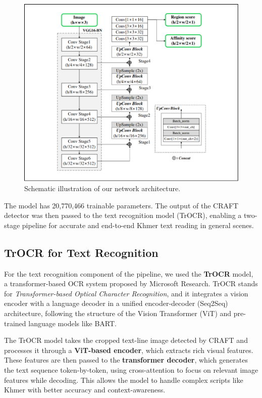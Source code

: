 \begin{figure}[H]
    \centering
    \includegraphics[width=\textwidth]{figures/craft_model.png}
    \caption{Schematic illustration of our network architecture.
    \citep{baek2019craft}}
    \label{fig:craft-model}
\end{figure}

The model has 20,770,466 trainable parameters. The output of the CRAFT detector was then passed to the text recognition 
model (TrOCR), enabling a two-stage pipeline for accurate and end-to-end 
Khmer text reading in general scenes.

\subsection{TrOCR for Text Recognition}
\label{subsec:trocr}

For the text recognition component of the pipeline, we used the \textbf{TrOCR} model, 
a transformer-based OCR system proposed by Microsoft Research. TrOCR stands for 
\textit{Transformer-based Optical Character Recognition}, and it integrates a vision 
encoder with a language decoder in a unified encoder-decoder (Seq2Seq) architecture, 
following the structure of the Vision Transformer (ViT) and pre-trained language models 
like BART.

The TrOCR model takes the cropped text-line image detected by CRAFT and processes it through a \textbf{ViT-based encoder}, which extracts rich visual features. These features are then passed to the \textbf{transformer decoder}, which generates the text sequence token-by-token, using cross-attention to focus on relevant image features while decoding. This allows the model to handle complex scripts like Khmer with better accuracy and context-awareness.

